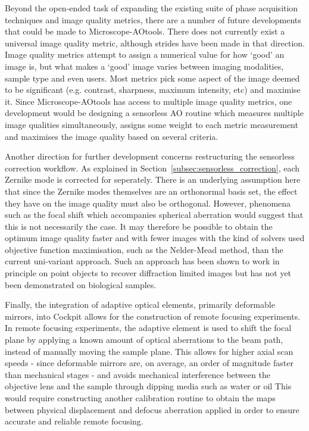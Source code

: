 Beyond the open-ended task of expanding the existing suite of phase 
acquisition techniques and image quality metrics, there are a number of 
future developments that could be made to Microscope-AOtools. There does 
not currently exist a universal image quality metric, although strides have 
been made in that direction.\cite{antonello2020multi} Image quality metrics 
attempt to assign a numerical value for how `good' an image is, but what 
makes a `good' image varies between imaging modalities, sample type and 
even users. Most metrics pick some aspect of the image deemed to be 
significant (e.g. contrast, sharpness, maximum intensity, etc) and maximise 
it. Since Microscope-AOtools has access to multiple image quality metrics, 
one development would be designing a sensorless AO routine which measures 
multiple image qualities simultaneously, assigns some weight to each metric 
measurement and maximises the image quality based on several criteria.

Another direction for further development concerns restructuring the 
sensorless correction workflow. As explained in 
Section~\ref{subsec:sensorless_correction}, each Zernike mode is corrected 
for seperately. There is an underlying assumption here that since the 
Zernike modes themselves are an orthonormal basis set, the effect they have 
on the image quality must also be orthogonal. However, phenomena such as 
the focal shift which accompanies spherical aberration would suggest that 
this is not necessarily the case\cite{torok1997role}. It may therefore be 
possible to obtain the optimum image quality faster and with fewer images 
with the kind of solvers used objective function maximisation, such as the 
Nelder-Mead method, than the current uni-variant 
approach\cite{nelder1965simplex}. Such an approach has been shown to work 
in principle on point objects to recover diffraction limited images but has 
not yet been demonstrated on biological samples\cite{murray2005wavefront}.

Finally, the integration of adaptive optical elements, primarily deformable 
mirrors, into Cockpit allows for the construction of remote focusing 
experiments. In remote focusing experiments, the adaptive element is used 
to shift the focal plane by applying a known amount of optical aberrations 
to the beam path, instead of manually moving the sample plane. This allows 
for higher axial scan speeds - since deformable mirrors are, on average, an 
order of magnitude faster than mechanical stages - and avoids mechanical 
interference between the objective lens and the sample through dipping 
media such as water or oil\cite{botcherby2008optical,vzurauskas2017rapid} 
This would require constructing another calibration routine to obtain the 
maps between physical displacement and defocus aberration applied in order 
to ensure accurate and reliable remote focusing.